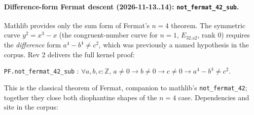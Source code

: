 \paragraph{Difference-form Fermat descent (2026-11-13..14): \texttt{not\_fermat\_42\_sub}.}

Mathlib provides only the sum form of Fermat's $n = 4$ theorem.  The
symmetric curve $y^2 = x^3 - x$ (the congruent-number curve for $n = 1$,
$E_{32.\text{a}2}$, rank $0$) requires the \emph{difference} form
$a^4 - b^4 \neq c^2$, which was previously a named hypothesis in the corpus.
Rev 2 delivers the full kernel proof:
\begin{center}
\texttt{PF.not\_fermat\_42\_sub} : $\forall a, b, c : \mathbb{Z}$,
  $a \neq 0 \to b \neq 0 \to c \neq 0 \to a^4 - b^4 \neq c^2$.
\end{center}
This is the classical theorem of Fermat, companion to mathlib's
\texttt{not\_fermat\_42}; together they close both diophantine shapes of the
$n = 4$ case.  Dependencies and site in the corpus:
